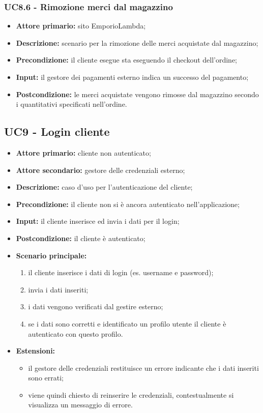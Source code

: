 \subsubsection{UC8.6 - Rimozione merci dal magazzino}
\label{UC8.6}
\begin{itemize}
    \item \textbf{Attore primario:} sito EmporioLambda;
    \item \textbf{Descrizione:} scenario per la rimozione delle merci acquistate dal magazzino;
    \item \textbf{Precondizione:} il cliente esegue sta eseguendo il checkout dell'ordine;
    \item \textbf{Input:} il gestore dei pagamenti esterno indica un successo del pagamento;
    \item \textbf{Postcondizione:} le merci acquistate vengono rimosse dal magazzino secondo i quantitativi specificati nell'ordine.
\end{itemize}

\subsection{UC9 - Login cliente}
\label{UC9}
\begin{itemize}
    \item \textbf{Attore primario:} cliente non autenticato;
    \item \textbf{Attore secondario:} gestore delle credenziali esterno;
    \item \textbf{Descrizione:} caso d'uso per l'autenticazione del cliente;
    \item \textbf{Precondizione:} il cliente non si è ancora autenticato nell'applicazione;
    \item \textbf{Input:} il cliente inserisce ed invia i dati per il login;
    \item \textbf{Postcondizione:} il cliente è autenticato;
    \item \textbf{Scenario principale:}
    \begin{enumerate}
        \item il cliente inserisce i dati di login (es. username e password);
        \item invia i dati inseriti;
        \item i dati vengono verificati dal gestire esterno;
        \item se i dati sono corretti e identificato un profilo utente il cliente è autenticato con questo profilo.
    \end{enumerate}
    \item \textbf{Estensioni:}
    \begin{itemize}
        \item il gestore delle credenziali restituisce un errore indicante che i dati inseriti sono errati;
        \item viene quindi chiesto di reinserire le credenziali, contestualmente si visualizza un messaggio di errore.
    \end{itemize}
\end{itemize}


